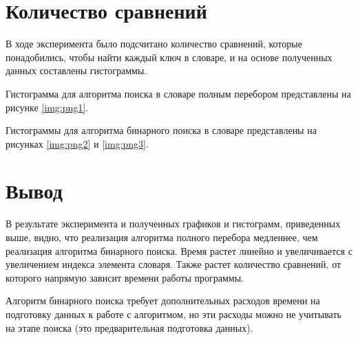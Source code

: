 \newpage

\section{Количество сравнений}
В ходе эксперимента было подсчитано количество сравнений, которые понадобились, чтобы найти каждый ключ в словаре, и на основе полученных данных составлены гистограммы.

Гистограмма для алгоритма поиска в словаре полным перебором представлены на рисунке \ref{img:png1}.



Гистограммы для алгоритма бинарного поиска в словаре представлены на рисунках \ref{img:png2} и \ref{img:png3}.


\clearpage

\section{Вывод}
В результате эксперимента и полученных графиков и гистограмм, приведенных выше, видно, что реализация алгоритма полного перебора медленнее, чем реализация алгоритма бинарного поиска. Время растет линейно и увеличивается с увеличением индекса элемента словаря. Также растет количество сравнений, от которого напрямую зависит времени работы программы.

Алгоритм бинарного поиска требует дополнительных расходов времени на подготовку данных к работе с алгоритмом, но эти расходы можно не учитывать на этапе поиска (это предварительная подготовка данных).